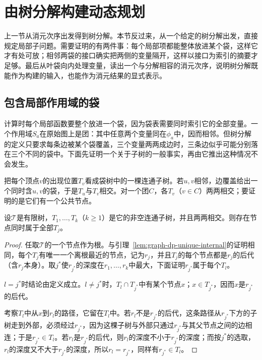 
\section{由树分解构建动态规划}
\label{sec:graph-dp-from-decomposition}

上一节从消元次序出发得到树分解。本节反过来，从一个给定的树分解出发，直接规定局部子问题。需要证明的有两件事：每个局部项都能整体放进某个袋，这样它才有处可放；相邻两袋的接口确实把两侧的变量隔开，这样以接口为索引的摘要才足够。最后从叶袋向内处理变量，读出一个与分解相容的消元次序，说明树分解既能作为构建的输入，也能作为消元结果的显式表示。

\subsection{包含局部作用域的袋}
\label{sec:graph-dp-clique-containment}

计算时每个局部函数要整个放进一个袋，因为袋表需要同时索引它的全部变量。一个作用域$S_a$在原始图上是团：其中任意两个变量同在$\phi_a$中，因而相邻。但树分解的定义只要求每条边被某个袋覆盖，三个变量两两成边时，三条边似乎可能分别落在三个不同的袋中。下面先证明一个关于子树的一般事实，再由它推出这种情况不会发生。

把每个顶点$v$的出现位置$T_v$看成袋树中的一棵连通子树。若$u,v$相邻，边覆盖给出一个同时含$u,v$的袋，于是$T_u$与$T_v$相交。对一个团$C$，各$T_v$（$v\in C$）两两相交；要证明的是它们有一个公共节点。

\begin{lemma}[两两相交的子树有公共节点]
\label{lem:graph-dp-subtree-helly}
设$\mathcal T$是有限树，$T_1,\ldots,T_k$（$k\geq1$）是它的非空连通子树，并且两两相交。则存在节点同时属于全部$T_j$。
\end{lemma}

\begin{proof}
任取$\mathcal T$的一个节点作为根。与引理~\ref{lem:graph-dp-unique-internal}的证明相同，每个$T_j$有唯一一个离根最近的节点，记为$r_j$，并且$T_j$的每个节点都是$r_j$的后代（含$r_j$本身）。取$j^\ast$使$r_{j^\ast}$的深度在$r_1,\ldots,r_k$中最大，下面证明$r_{j^\ast}$属于每个$T_l$。

$l=j^\ast$时结论由定义成立。$l\neq j^\ast$时，$T_l\cap T_{j^\ast}$中有某个节点$x$；$x\in T_{j^\ast}$，因而$x$是$r_{j^\ast}$的后代。

考察$T_l$中从$x$到$r_l$的路径，它留在$T_l$中。若$r_l$不是$r_{j^\ast}$的后代，这条路径从$r_{j^\ast}$下方的子树走到外部，必须经过$r_{j^\ast}$，因为这棵子树与外部只通过$r_{j^\ast}$与其父节点之间的边相连；于是$r_{j^\ast}\in T_l$。若$r_l$是$r_{j^\ast}$的后代，则$r_l$的深度不小于$r_{j^\ast}$的深度；而按$j^\ast$的选取，$r_l$的深度又不大于$r_{j^\ast}$的深度，所以$r_l=r_{j^\ast}$，同样有$r_{j^\ast}\in T_l$。
\end{proof}

